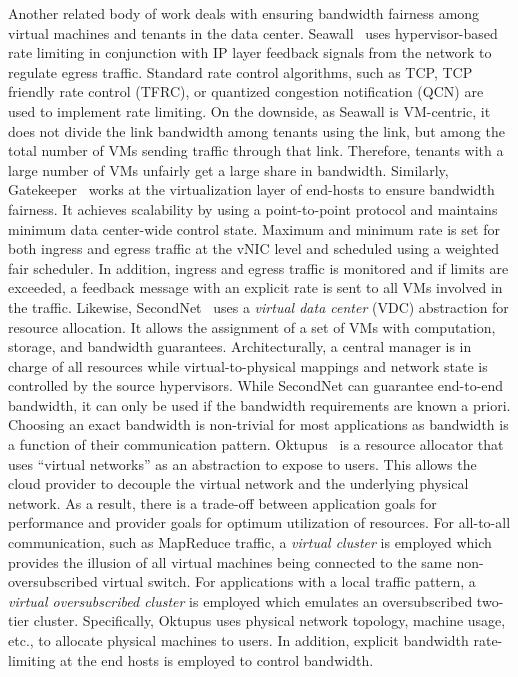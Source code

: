 \documentclass[a4paper,12pt,twoside,openright]{report}
\begin{document}
Another related body of work deals with ensuring bandwidth fairness among
virtual machines and tenants in the data center. Seawall~\cite{Shieh:2010:SPI}
uses hypervisor-based rate limiting in conjunction with IP layer feedback
signals from the network to regulate egress traffic. Standard rate control
algorithms, such as TCP, TCP friendly rate control (TFRC), or quantized
congestion notification (QCN) are used to implement rate limiting. On the
downside, as Seawall is VM-centric, it does not divide the link bandwidth among
tenants using the link, but among the total number of VMs sending traffic
through that link. Therefore, tenants with a large number of VMs unfairly get a
large share in bandwidth. Similarly, Gatekeeper~\cite{Rodrigues:2011:GSB} works
at the virtualization layer of end-hosts to ensure bandwidth fairness. It
achieves scalability by using a point-to-point protocol and maintains minimum
data center-wide control state. Maximum and minimum rate is set for both ingress
and egress traffic at the vNIC level and scheduled using a weighted fair
scheduler. In addition, ingress and egress traffic is monitored and if limits
are exceeded, a feedback message with an explicit rate is sent to all VMs
involved in the traffic. Likewise, SecondNet~\cite{Guo:2010:SDC} uses a
\emph{virtual data center} (VDC) abstraction for resource allocation. It allows
the assignment of a set of VMs with computation, storage, and bandwidth
guarantees. Architecturally, a central manager is in charge of all resources
while virtual-to-physical mappings and network state is controlled by the source
hypervisors. While SecondNet can guarantee end-to-end bandwidth, it can only be
used if the bandwidth requirements are known a priori. Choosing an exact
bandwidth is non-trivial for most applications as bandwidth is a function of
their communication pattern. Oktupus~\cite{Ballani:2011:TPD} is a resource
allocator that uses ``virtual networks'' as an abstraction to expose to users.
This allows the cloud provider to decouple the virtual network and the
underlying physical network. As a result, there is a trade-off between
application goals for performance and provider goals for optimum utilization of
resources. For all-to-all communication, such as MapReduce traffic, a
\emph{virtual cluster} is employed which provides the illusion of all virtual
machines being connected to the same non-oversubscribed virtual switch.  For
applications with a local traffic pattern, a \emph{virtual oversubscribed
cluster} is employed which emulates an oversubscribed two-tier cluster.
Specifically, Oktupus uses physical network topology, machine usage, etc., to
allocate physical machines to users. In addition, explicit bandwidth
rate-limiting at the end hosts is employed to control bandwidth.
\end{document}
